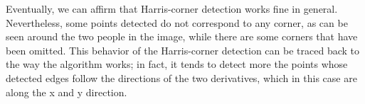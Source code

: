 Eventually, we can affirm that Harris-corner detection works fine in general. 
Nevertheless, some points detected do not correspond to any corner, as can be seen around the two people in the image, while there are some corners that have been omitted.
This behavior of the Harris-corner detection can be traced back to the way the algorithm works; in fact, it tends to detect more the points whose detected edges follow the directions of the two derivatives, which in this case are along the x and y direction.
